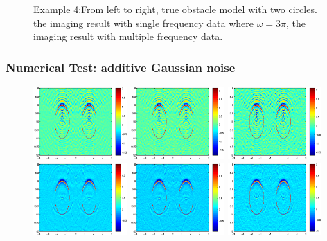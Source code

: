 \documentclass[cjk,8pt]{beamer}
\newcommand{\om}{\omega}
\begin{document}
\begin{CJK*}{GBK}{kai}
\begin{frame}
\begin{figure}[h]
	\caption{Example 4:From left to right,  true obstacle model with two circles. the imaging result
		with single frequency data where $\om=3\pi$, the imaging result with multiple frequency data.}
\end{figure}
\end{frame}

\begin{frame}
\frametitle{Numerical Test: additive Gaussian noise}
\begin{figure}[h]
	\centering
	\includegraphics[width=0.32\textwidth]{./graphic/bi_circle_4pi_error2.eps}
	\includegraphics[width=0.32\textwidth]{./graphic/bi_circle_4pi_error4.eps}
	\includegraphics[width=0.32\textwidth]{./graphic/bi_circle_4pi_error6.eps}\\
	\includegraphics[width=0.32\textwidth]{./graphic/bi_circle_multi_2_8_error2.eps}
	\includegraphics[width=0.32\textwidth]{./graphic/bi_circle_multi_2_8_error4.eps}
	\includegraphics[width=0.32\textwidth]{./graphic/bi_circle_multi_2_8_error6.eps}
	

\end{figure}
\end{frame}
\end{CJK*}
\end{document}
